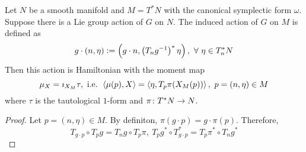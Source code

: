 \documentclass[a4paper,12pt]{article}
\begin{document}
	\begin{exam}
		Let $N$ be a smooth manifold and $M = T^*N$ with the canonical symplectic form $\omega$. Suppose there is a Lie group action of $G$ on $N$. The induced action of $G$ on $M$ is defined as
		\begin{equation*}
			g \cdot (n,\eta) \vcentcolon= \left(g \cdot n,\left(T_ng^{-1}\right)^*\eta\right),~\forall~\eta \in T_n^*N
		\end{equation*}
		Then this action is Hamiltonian with the moment map
		\begin{equation*}
			\mu_X = \imath_{X_M} \tau,\text{ i.e. }  \left\langle \mu(p),X \right\rangle = \left\langle \eta,T_p\pi(X_M(p)) \right\rangle,~p =(n,\eta) \in M 
		\end{equation*}
		where $\tau$ is the tautological $1$-form and $\pi  \colon T^*N \rightarrow N$. 
		\begin{proof}
			Let $p = (n,\eta) \in M $. By definiton, $\pi (g \cdot p) = g \cdot \pi(p)$. Therefore,
			\begin{equation*}
				T_{g \cdot p} \circ T_pg = T_ng \circ T_p\pi,~T_pg^* \circ T_{g \cdot p}^* = T_p\pi^* \circ T_ng^*
			\end{equation*}
			

\end{proof}
\end{exam}
\end{document}
